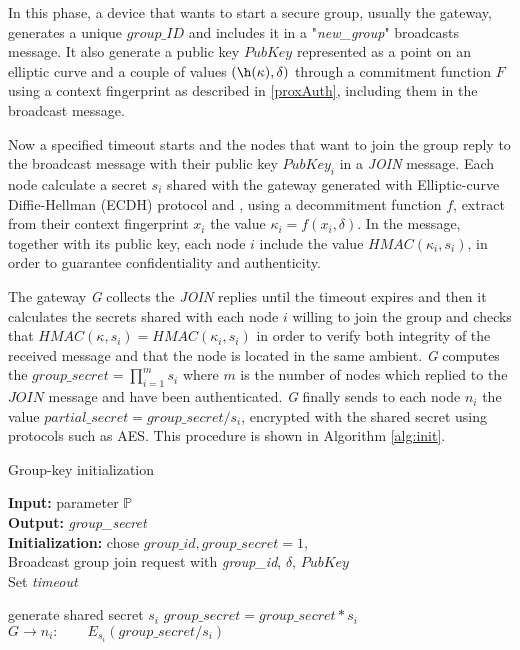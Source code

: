 In this phase, a device that wants to start a secure group, usually the gateway, generates a unique $group\_ID$ and includes it in a "\textit{new\_group}" broadcasts message.
It also generate a public key $PubKey$ represented as a point on an elliptic curve and a couple of values $(\h(\kappa), \delta)$ through a commitment function $F$ using a context fingerprint as described in \ref{proxAuth}, including them in the broadcast message.

Now a specified timeout starts and the nodes that want to join the group reply to the broadcast message with their public key $PubKey_i$ in a \textit{JOIN} message. 
Each node calculate a secret $s_i$ shared with the gateway generated with Elliptic-curve Diffie-Hellman (\acs{ECDH}) protocol and , using a decommitment function $f$, extract from their context fingerprint $x_i$ the value $\kappa_i = f(x_i, \delta)$.
In the message, together with its public key, each node $i$ include the value $HMAC(\kappa_i, s_i)$, in order to guarantee confidentiality and authenticity.

The gateway \textit{G} collects the \textit{JOIN} replies until the timeout expires and then it calculates the secrets shared with each node $i$ willing to join the group and checks that $HMAC(\kappa , s_i) = HMAC(\kappa_i, s_i)$ in order to verify both integrity of the received message and that the node is located in the same ambient.
\textit{G} computes the $group\_secret = \prod_{i=1}^{m} s_{i}$ where $m$ is the number of nodes which replied to the $JOIN$ message and have been authenticated. \textit{G} finally sends to each node $n_i$ the value $partial\_secret = group\_secret / s_i$, encrypted with the shared secret using protocols such as AES.
This procedure is shown in Algorithm \ref{alg:init}.

\begin{algorithm}
\caption{Group-key initialization }\label{alg:init}
\hspace*{\algorithmicindent} \textbf{Input:} parameter $\mathbb{P}$ \\
\hspace*{\algorithmicindent} \textbf{Output:} \textit{group\_secret} \\
\hspace*{\algorithmicindent} \textbf{Initialization:} chose $group\_id, group\_secret = 1$, \\
\hspace*{\algorithmicindent} Broadcast group join request with {\textit{group\_id}, $\delta$, $PubKey$ }\\
\hspace*{\algorithmicindent} Set \textit{timeout}
\begin{algorithmic}[1]
\State generate shared secret $s_i$
\State $group\_secret = group\_secret * s_i$
\EndIf
\EndFor{}
\EndWhile\label{secret}
\State $G \rightarrow n_i: \qquad E_{s_i}(group\_secret / s_i)$
\EndFor{}
\end{algorithmic}
\end{algorithm}


